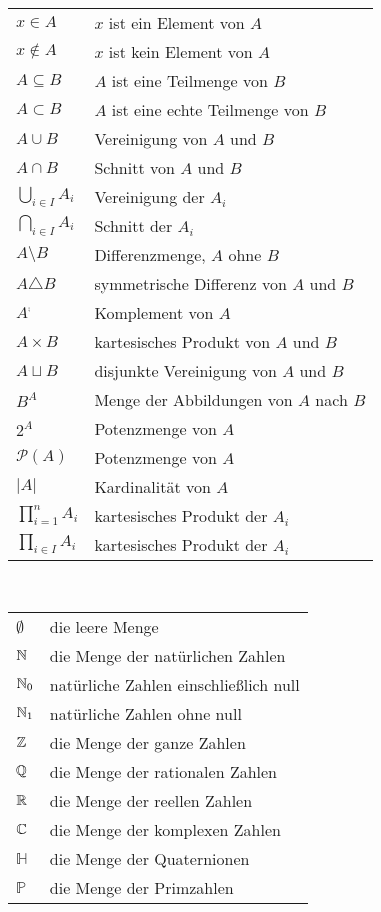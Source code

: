 \vspace{0.8em}\noindent
{}\\
\begin{tabular}{@{}ll}
$x\in A$ & $x$ ist ein Element von $A$\\
$x\notin A$ & $x$ ist kein Element von $A$\\
$A\subseteq B$ & $A$ ist eine Teilmenge von $B$\\
$A\subset B$ & $A$ ist eine echte Teilmenge von $B$\\
$A\cup B$ & Vereinigung von $A$ und $B$\\
$A\cap B$ & Schnitt von $A$ und $B$\\
$\bigcup_{i\in I} A_i$ & Vereinigung der $A_i$\\
$\bigcap_{i\in I} A_i$ & Schnitt der $A_i$\\
$A\setminus B$ & Differenzmenge, $A$ ohne $B$\\
$A\triangle B$ & symmetrische Differenz von $A$ und $B$\\
$A^\comp$ & Komplement von $A$\\
$A\times B$ & kartesisches Produkt von $A$ und $B$\\
$A\sqcup B$ & disjunkte Vereinigung von $A$ und $B$\\
$B^A$ & Menge der Abbildungen von $A$ nach $B$\\
$2^A$ & Potenzmenge von $A$\\
$\mathcal P(A)$ & Potenzmenge von $A$\\
$|A|$ & Kardinalität von $A$\\
$\prod_{i=1}^n A_i$ & kartesisches Produkt der $A_i$\\
$\prod_{i\in I} A_i$ & kartesisches Produkt der $A_i$
\end{tabular}

\vspace{0.8em}\noindent
{}\\
\begin{tabular}{@{}ll}
$\emptyset$ & die leere Menge\\
$\mathbb N$ & die Menge der natürlichen Zahlen\\
$\mathbb N_0$ & natürliche Zahlen einschließlich null\\
$\mathbb N_1$ & natürliche Zahlen ohne null\\
$\mathbb Z$ & die Menge der ganze Zahlen\\
$\mathbb Q$ & die Menge der rationalen Zahlen\\
$\mathbb R$ & die Menge der reellen Zahlen\\
$\mathbb C$ & die Menge der komplexen Zahlen\\
$\mathbb H$ & die Menge der Quaternionen\\
$\mathbb P$ & die Menge der Primzahlen
\end{tabular}

